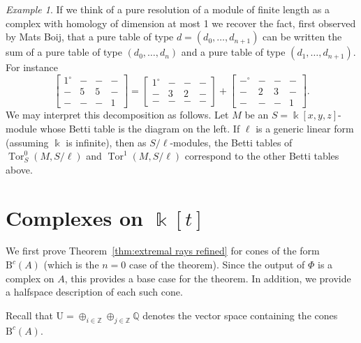 \documentclass[12pt]{amsart}
\theoremstyle{definition}
\theoremstyle{remark}
\newtheorem{example}[lemma]{Example}
\newcommand{\Tor}{\operatorname{Tor}}
\newcommand{\kk}{\Bbbk}
\newcommand{\ZZ}{\mathbb{Z}}
\newcommand{\QQ}{\mathbb{Q}}
\newcommand{\UU}{\mathrm{U}}
\newcommand{\cc}{c}
\newcommand{\zp}{\circ}
\newcommand{\BBQ}{\mathrm{B}}
\begin{document}
\begin{example}
If we think of a pure resolution of a module of finite length as a complex with homology of dimension at most 1 we recover the fact, first observed by Mats Boij, that a pure table of type $d=(d_0, \dots, d_{n+1})$ can be written the sum of a pure table of type $(d_0, \dots, d_n)$ and a  pure table of type $(d_1, \dots, d_{n+1})$.  For instance
\[
\begin{bmatrix}
1^{\zp}&-&-&-\\
-&5&5&-\\
-&-&-&1
\end{bmatrix}
=
\begin{bmatrix}
1^{\zp}&-&-&-\\
-&3&2&-\\
-&-&-&-
\end{bmatrix}
+
\begin{bmatrix}
-^{\zp}&-&-&-\\
-&2&3&-\\
-&-&-&1
\end{bmatrix}.
\]
We may interpret this decomposition as follows.  Let $M$ be an $S=\kk[x,y,z]$-module whose Betti table is the diagram on the left. If $\ell$ is a generic linear form (assuming $\kk$ is infinite), then as $S/\ell$-modules, the Betti tables of $\Tor^0_S(M,S/\ell)$ and $\Tor^1(M,S/\ell)$ correspond to the other Betti tables above.
\end{example}






\section{Complexes on $\kk[t]$}\label{sec:A}
We first prove Theorem~\ref{thm:extremal rays refined} for cones of the form $\BBQ^{\cc}(A)$ (which is the $n=0$ case of the theorem).
Since the output of $\Phi$ is a complex on $A$, this provides a base case for the theorem.  In addition, we provide a halfspace description of each such cone.

Recall that $\UU= \oplus_{i\in \ZZ} \oplus_{j\in \ZZ}\QQ$  denotes the vector space containing the cones $\BBQ^{\cc}(A)$. 
\end{document}
